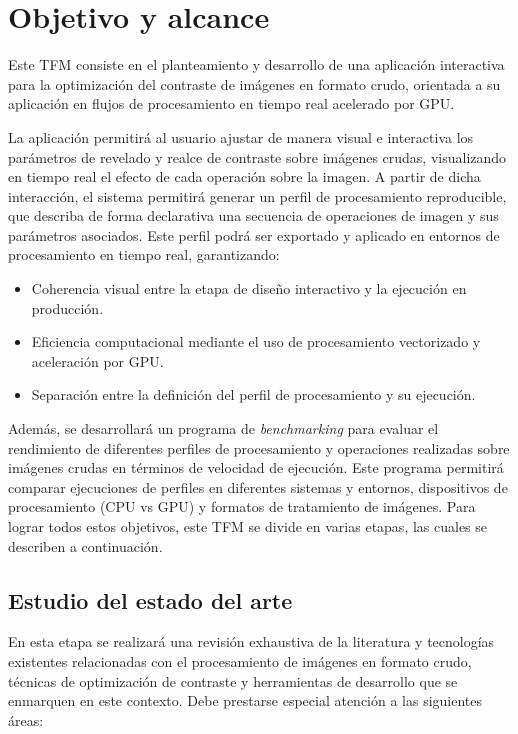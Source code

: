 \section{Objetivo y alcance} \label{sec:2_objetivo_y_alcance}
Este TFM consiste en el planteamiento y desarrollo de una aplicación
interactiva para la optimización del contraste de imágenes en formato crudo, orientada 
a su aplicación en flujos de procesamiento en tiempo real acelerado por GPU.

La aplicación permitirá al usuario ajustar de manera visual e interactiva los parámetros 
de revelado y realce de contraste sobre imágenes crudas, visualizando en tiempo real el
efecto de cada operación sobre la imagen. A partir de dicha interacción, el sistema permitirá
generar un perfil de procesamiento reproducible, que describa de forma declarativa una 
secuencia de operaciones de imagen y sus parámetros asociados. Este perfil podrá ser 
exportado y aplicado en entornos de procesamiento en tiempo real, garantizando:

\begin{itemize}[noitemsep]
    \item Coherencia visual entre la etapa de diseño interactivo y la ejecución 
    en producción.
    \item Eficiencia computacional mediante el uso de procesamiento vectorizado y
    aceleración por GPU.
    \item Separación entre la definición del perfil de procesamiento y su ejecución.
\end{itemize}

Además, se desarrollará un programa de \textit{benchmarking} para evaluar el rendimiento
de diferentes perfiles de procesamiento y operaciones realizadas sobre imágenes crudas
en términos de velocidad de ejecución.
Este programa permitirá comparar ejecuciones de perfiles en diferentes sistemas y entornos, 
dispositivos de procesamiento (CPU vs GPU) y formatos de tratamiento de imágenes.
Para lograr todos estos objetivos, este TFM se divide en varias etapas, las cuales se 
describen a continuación.

\subsection{Estudio del estado del arte} \label{subsec:2_1_estudio_estado_arte}

En esta etapa se realizará una revisión exhaustiva de la literatura y tecnologías
existentes relacionadas con el procesamiento de imágenes en formato crudo,
técnicas de optimización de contraste y herramientas de desarrollo que se enmarquen 
en este contexto. Debe prestarse especial atención a las siguientes áreas:

